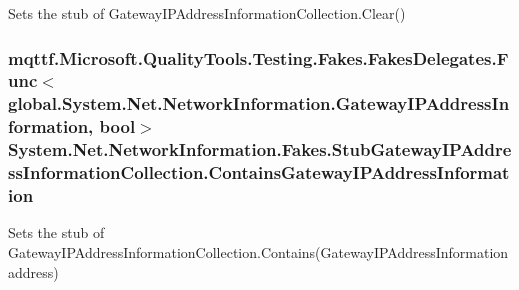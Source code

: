 Sets the stub of Gateway\-I\-P\-Address\-Information\-Collection.\-Clear()

\hypertarget{class_system_1_1_net_1_1_network_information_1_1_fakes_1_1_stub_gateway_i_p_address_information_collection_a938fb52310a541b2fc600eb4429f5c82}{
\subsubsection[{Contains\-Gateway\-I\-P\-Address\-Information}]{\setlength{\rightskip}{0pt plus 5cm}mqttf.\-Microsoft.\-Quality\-Tools.\-Testing.\-Fakes.\-Fakes\-Delegates.\-Func$<$global.\-System.\-Net.\-Network\-Information.\-Gateway\-I\-P\-Address\-Information, bool$>$ System.\-Net.\-Network\-Information.\-Fakes.\-Stub\-Gateway\-I\-P\-Address\-Information\-Collection.\-Contains\-Gateway\-I\-P\-Address\-Information}}\label{class_system_1_1_net_1_1_network_information_1_1_fakes_1_1_stub_gateway_i_p_address_information_collection_a938fb52310a541b2fc600eb4429f5c82}


Sets the stub of Gateway\-I\-P\-Address\-Information\-Collection.\-Contains(\-Gateway\-I\-P\-Address\-Information address)

